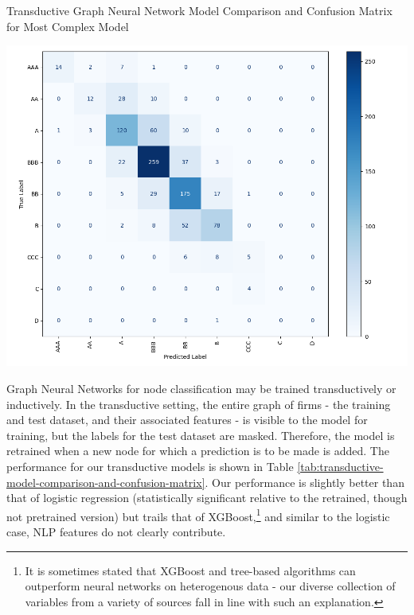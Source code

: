 \documentclass{article}[11pt]
\begin{document}
    \begin{table}[h!]
        \centering
        \caption{Transductive Graph Neural Network Model Comparison and Confusion Matrix for Most Complex Model}
        \begin{minipage}[c]{0.495\linewidth}
            \centering
            
        \end{minipage}
        \begin{minipage}[c]{0.495\linewidth}
            \centering
            \includegraphics[width=0.95\hsize]{../Output/Modelling/Graph Neural Network/Transductive/confusion_matrix_no_title.png}
        \end{minipage}
        \label{tab:transductive-model-comparison-and-confusion-matrix}
    \end{table}

    Graph Neural Networks for node classification may be trained transductively or inductively. In the transductive setting, the entire graph of firms - the training and test dataset, and their associated features - is visible to the model for training, but the labels for the test dataset are masked. Therefore, the model is retrained when a new node for which a prediction is to be made is added. The performance for our transductive models is shown in Table \ref{tab:transductive-model-comparison-and-confusion-matrix}. Our performance is slightly better than that of logistic regression (statistically significant relative to the retrained, though not pretrained version) but trails that of XGBoost,\footnote{It is sometimes stated that XGBoost and tree-based algorithms can outperform neural networks on heterogenous data - our diverse collection of variables from a variety of sources fall in line with such an explanation.} and similar to the logistic case, NLP features do not clearly contribute.
\end{document}

